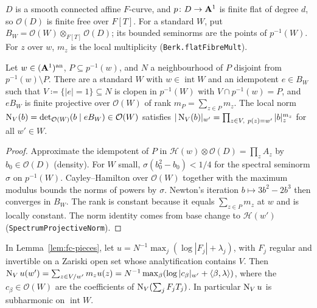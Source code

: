 \begin{convention}\label{conv:fc-curve}
\notready
{}
$D$ is a smooth connected affine $F$-curve, and $p\colon D\to\mathbf{A}^1$ is finite flat of degree $d$, so $\mathcal O(D)$ is finite free over
$F[T]$. For a standard $W$, put $B_W=\mathcal O(W)\otimes_{F[T]}\mathcal O(D)$; its bounded seminorms are the points of $p^{-1}(W)$.
For $z$ over $w$, $m_z$ is the local multiplicity (\texttt{Berk.flatFibreMult}).
\end{convention}

\begin{lemma}[Pieces]\label{lem:fc-pieces}
\notready
{}
Let $w\in(\mathbf{A}^1)^{\mathrm{an}}$, $P\subseteq p^{-1}(w)$, and $N$ a neighbourhood of $P$ disjoint from $p^{-1}(w)\setminus P$. There are a
standard $W$ with $w\in\operatorname{int}W$ and an idempotent $e\in B_W$ such that $V\coloneqq\{|e|=1\}\subseteq N$ is clopen in
$p^{-1}(W)$ with $V\cap p^{-1}(w)=P$, and $eB_W$ is finite projective over $\mathcal O(W)$ of rank $m_P=\sum_{z\in P}m_z$. The local
norm $\operatorname{N}_V(b)=\det_{\mathcal O(W)}(b\mid eB_W)\in\mathcal O(W)$ satisfies $|\Norm_V(b)|_{w'}=\prod_{z\in V,\ p(z)=w'}|b|_z^{m_z}$ for all
$w'\in W$.
\end{lemma}

\begin{proof}
Approximate the idempotent of $P$ in $\mathcal H(w)\otimes\mathcal O(D)=\prod_zA_z$ by $b_0\in\mathcal O(D)$ (density). For $W$ small,
$\sigma(b_0^2-b_0)<1/4$ for the spectral seminorm $\sigma$ on $p^{-1}(W)$. Cayley--Hamilton over $\mathcal O(W)$ together with
the maximum modulus bounds the norms of powers by $\sigma$. Newton's iteration $b\mapsto3b^2-2b^3$ then converges in
$B_W$. The rank is constant because it equals $\sum_{z\in P}m_z$ at $w$ and is locally constant. The norm identity comes
from base change to $\mathcal H(w')$ (\texttt{SpectrumProjectiveNorm}).
\end{proof}

\begin{lemma}\label{lem:fc-local-norm-fs}
\notready
{}
In Lemma~\ref{lem:fc-pieces}, let $u=N^{-1}\max_j(\log|F_j|+\lambda_j)$, with $F_j$ regular and invertible on a Zariski
open set whose analytification contains $V$. Then
$\operatorname{N}_Vu(w')=\sum_{z\in V/w'}m_zu(z)=N^{-1}\max_\beta(\log|c_\beta|_{w'}+\langle\beta,\lambda\rangle)$, where the $c_\beta\in\mathcal O(W)$ are
the coefficients of $\operatorname{N}_V(\sum_jF_jT_j)$. In particular $\operatorname{N}_Vu$ is subharmonic on $\operatorname{int}W$.
\end{lemma}


